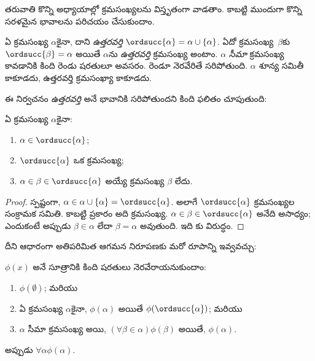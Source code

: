 \documentclass[../../../include/open-logic-section]{subfiles}
\begin{document}

తరువాతి కొన్ని అధ్యాయాల్లో క్రమసంఖ్యలను విస్తృతంగా వాడతాం.
కాబట్టి ముందుగా కొన్ని సరళమైన భావాలను పరిచయం చేసుకుందాం.

\begin{defn}
ఏ క్రమసంఖ్య $\alpha$కైనా,
దాని \emph{ఉత్తరవర్తి}
$\ordsucc{\alpha}
=\alpha \cup \{\alpha\}$.
ఏదో క్రమసంఖ్య~$\beta$కు
$\ordsucc{\beta} = \alpha$
అయితే $\alpha$ను
\emph{ఉత్తరవర్తి}
క్రమసంఖ్య అంటాం.
$\alpha$ \emph{సీమా} క్రమసంఖ్య కావడానికి కింది రెండు షరతులూ అవసరం. రెండూ నెరవేరితే సరిపోతుంది.
$\alpha$ శూన్య సమితీ కాకూడదు, ఉత్తరవర్తి క్రమసంఖ్యా కాకూడదు.
\end{defn}
\noindent
ఈ నిర్వచనం \emph{ఉత్తరవర్తి} అనే భావానికి సరిపోతుందని
కింది ఫలితం చూపుతుంది:

\begin{prop}
ఏ క్రమసంఖ్య $\alpha$కైనా:
\begin{enumerate}
	\item $\alpha \in \ordsucc{\alpha}$;
	\item $\ordsucc{\alpha}$ ఒక క్రమసంఖ్య;
	\item $\alpha \in \beta \in
	\ordsucc{\alpha}$ అయ్యే క్రమసంఖ్య $\beta$ లేదు.
	\end{enumerate}
\end{prop}

\begin{proof}
స్పష్టంగా,
$\alpha \in \alpha \cup \{\alpha\} = \ordsucc{\alpha}$.
అలాగే $\ordsucc{\alpha}$
క్రమసంఖ్యల సంక్రామక
సమితి. కాబట్టి
ప్రకారం అది క్రమసంఖ్య.
$\alpha \in \beta \in \ordsucc{\alpha}$
అనేది అసాధ్యం;
ఎందుకంటే అప్పుడు
$\beta \in \alpha$
లేదా $\beta = \alpha$ అవుతుంది.
ఇది కు
విరుద్ధం.
\end{proof}
\noindent
దీని ఆధారంగా అతిపరిమిత ఆగమన నిరూపణకు
మరో రూపాన్ని ఇవ్వవచ్చు:

\begin{thm}
$\phi(x)$ అనే సూత్రానికి కింది షరతులు నెరవేరాయనుకుందాం:
\begin{enumerate}
	\item $\phi(\emptyset)$; మరియు
	\item ఏ క్రమసంఖ్య $\alpha$కైనా, $\phi(\alpha)$ అయితే
	$\phi(\ordsucc{\alpha})$; మరియు
	\item $\alpha$ సీమా క్రమసంఖ్య అయి, $(\forall \beta \in
	\alpha)\phi(\beta)$ అయితే, $\phi(\alpha)$.
\end{enumerate}
అప్పుడు $\forall \alpha \phi(\alpha)$.
\end{thm}
\end{document}
